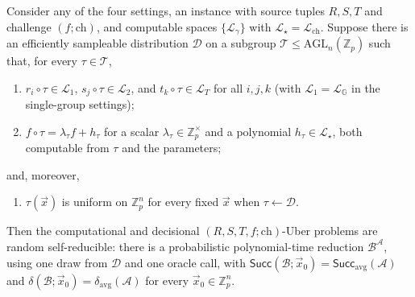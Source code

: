 \documentclass{conjura-solution}
\newcommand{\G}{\mathbb{G}}
\newcommand{\Zp}{\mathbb{Z}_p}
\newcommand{\Zpx}{\mathbb{Z}_p^{\times}}
\newcommand{\vx}{\vec{x}}
\newcommand{\Succ}{\mathsf{Succ}}
\newcommand{\LL}{\mathcal{L}}
\newcommand{\AGL}{\mathrm{AGL}}
\newcommand{\ch}{\mathrm{ch}}
\begin{document}
\begin{theorem}
\label{thm:master}
Consider any of the four settings, an instance with source tuples $R,S,T$ and challenge
$(f;\ch)$, and computable spaces $\{\LL_\gamma\}$ with $\LL_\star=\LL_{\ch}$. Suppose there
is an efficiently sampleable distribution $\mathcal D$ on a subgroup
$\mathcal T\le\AGL_n(\Zp)$ such that, for every $\tau\in\mathcal T$,
\begin{enumerate}[label=\textup{(C\arabic*)},leftmargin=3.4em,itemsep=3pt]
  \item $r_i\circ\tau\in\LL_1$, $s_j\circ\tau\in\LL_2$, and $t_k\circ\tau\in\LL_T$ for all
        $i,j,k$ (with $\LL_1=\LL_{\G}$ in the single-group settings);
  \item $f\circ\tau=\lambda_\tau f+h_\tau$ for a scalar $\lambda_\tau\in\Zpx$ and a
        polynomial $h_\tau\in\LL_\star$, both computable from $\tau$ and the parameters;
\end{enumerate}
and, moreover,
\begin{enumerate}[label=\textup{(C\arabic*)},leftmargin=3.4em,start=3]
  \item $\tau(\vx)$ is uniform on $\Zp^{n}$ for every fixed $\vx$ when $\tau\leftarrow\mathcal D$.
\end{enumerate}
Then the computational and decisional $(R,S,T,f;\ch)$-Uber problems are random
self-reducible: there is a probabilistic polynomial-time reduction $\mathcal B^{\mathcal A}$,
using one draw from $\mathcal D$ and one oracle call, with
$\Succ(\mathcal B;\vx_0)=\Succ_{\mathrm{avg}}(\mathcal A)$ and
$\delta(\mathcal B;\vx_0)=\delta_{\mathrm{avg}}(\mathcal A)$ for every $\vx_0\in\Zp^{n}$.
\end{theorem}
\end{document}
